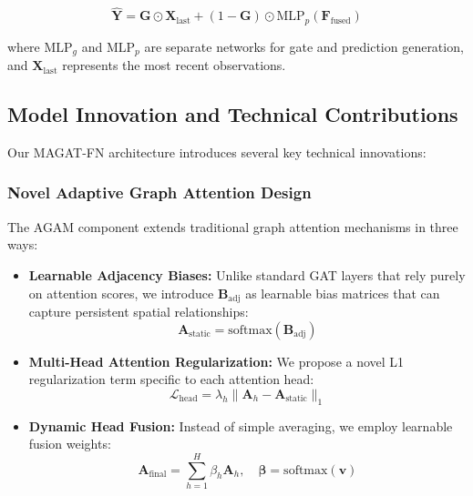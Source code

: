 \documentclass[lettersize, journal]{IEEEtran}
\begin{document}
\begin{equation}
\hat{\mathbf{Y}} = \mathbf{G} \odot \mathbf{X}_{\text{last}} + (1 - \mathbf{G}) \odot \text{MLP}_p(\mathbf{F}_{\text{fused}})
\end{equation}

where $\text{MLP}_g$ and $\text{MLP}_p$ are separate networks for gate and prediction generation, and $\mathbf{X}_{\text{last}}$ represents the most recent observations.

\subsection{Model Innovation and Technical Contributions}
Our MAGAT-FN architecture introduces several key technical innovations:

\subsubsection{Novel Adaptive Graph Attention Design}
The AGAM component extends traditional graph attention mechanisms in three ways:

\begin{itemize}
    \item \textbf{Learnable Adjacency Biases:} Unlike standard GAT layers that rely purely on attention scores, we introduce $\mathbf{B}_{\text{adj}}$ as learnable bias matrices that can capture persistent spatial relationships:
    \begin{equation}
    \mathbf{A}_{\text{static}} = \text{softmax}(\mathbf{B}_{\text{adj}})
    \end{equation}
    
    \item \textbf{Multi-Head Attention Regularization:} We propose a novel L1 regularization term specific to each attention head:
    \begin{equation}
    \mathcal{L}_{\text{head}} = \lambda_{h}\|\mathbf{A}_{h} - \mathbf{A}_{\text{static}}\|_1
    \end{equation}
    
    \item \textbf{Dynamic Head Fusion:} Instead of simple averaging, we employ learnable fusion weights:
    \begin{equation}
    \mathbf{A}_{\text{final}} = \sum_{h=1}^H \beta_h \mathbf{A}_h, \quad \boldsymbol{\beta} = \text{softmax}(\mathbf{v})
    \end{equation}
\end{itemize}
\end{document}
